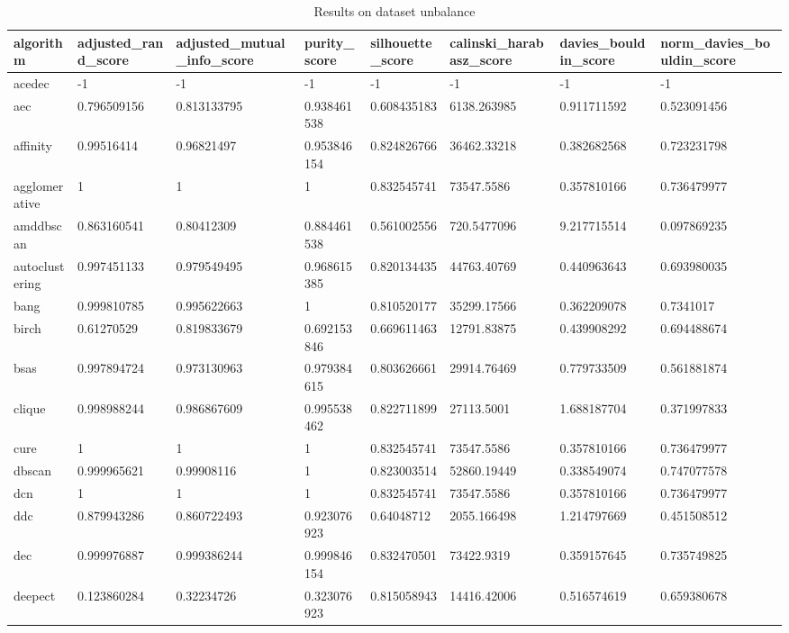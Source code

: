 \begin{table}[H]
\centering
\caption{Results on dataset unbalance}
\label{S69_Table}
\begin{tabular}{|l|l|l|l|l|l|l|l|}
\hline
algorithm & adjusted\_rand\_score & adjusted\_mutual\_info\_score & purity\_score & silhouette\_score & calinski\_harabasz\_score & davies\_bouldin\_score & norm\_davies\_bouldin\_score \\
\hline
acedec & -1 & -1 & -1 & -1 & -1 & -1 & -1 \\
\hline
aec & 0.796509156 & 0.813133795 & 0.938461538 & 0.608435183 & 6138.263985 & 0.911711592 & 0.523091456 \\
\hline
affinity & 0.99516414 & 0.96821497 & 0.953846154 & 0.824826766 & 36462.33218 & 0.382682568 & 0.723231798 \\
\hline
agglomerative & 1 & 1 & 1 & 0.832545741 & 73547.5586 & 0.357810166 & 0.736479977 \\
\hline
amddbscan & 0.863160541 & 0.80412309 & 0.884461538 & 0.561002556 & 720.5477096 & 9.217715514 & 0.097869235 \\
\hline
autoclustering & 0.997451133 & 0.979549495 & 0.968615385 & 0.820134435 & 44763.40769 & 0.440963643 & 0.693980035 \\
\hline
bang & 0.999810785 & 0.995622663 & 1 & 0.810520177 & 35299.17566 & 0.362209078 & 0.7341017 \\
\hline
birch & 0.61270529 & 0.819833679 & 0.692153846 & 0.669611463 & 12791.83875 & 0.439908292 & 0.694488674 \\
\hline
bsas & 0.997894724 & 0.973130963 & 0.979384615 & 0.803626661 & 29914.76469 & 0.779733509 & 0.561881874 \\
\hline
clique & 0.998988244 & 0.986867609 & 0.995538462 & 0.822711899 & 27113.5001 & 1.688187704 & 0.371997833 \\
\hline
cure & 1 & 1 & 1 & 0.832545741 & 73547.5586 & 0.357810166 & 0.736479977 \\
\hline
dbscan & 0.999965621 & 0.99908116 & 1 & 0.823003514 & 52860.19449 & 0.338549074 & 0.747077578 \\
\hline
dcn & 1 & 1 & 1 & 0.832545741 & 73547.5586 & 0.357810166 & 0.736479977 \\
\hline
ddc & 0.879943286 & 0.860722493 & 0.923076923 & 0.64048712 & 2055.166498 & 1.214797669 & 0.451508512 \\
\hline
dec & 0.999976887 & 0.999386244 & 0.999846154 & 0.832470501 & 73422.9319 & 0.359157645 & 0.735749825 \\
\hline
deepect & 0.123860284 & 0.32234726 & 0.323076923 & 0.815058943 & 14416.42006 & 0.516574619 & 0.659380678 \\

\end{tabular}
\end{table}
